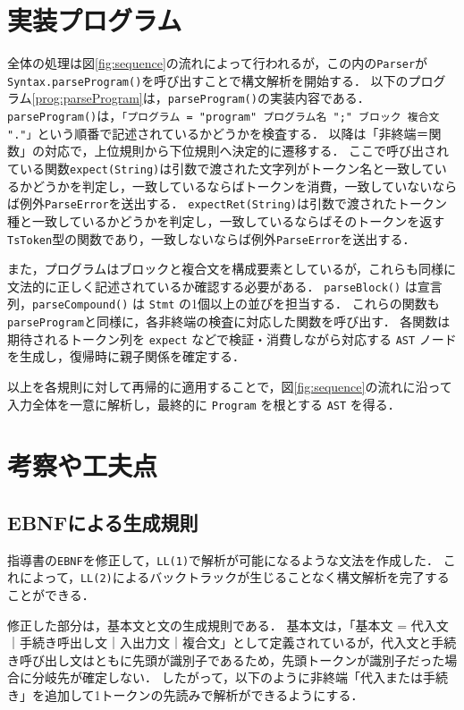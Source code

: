 \documentclass[a4j,10pt]{jarticle}
\begin{document}
\section{実装プログラム}
全体の処理は図\ref{fig:sequence}の流れによって行われるが，この内の\verb|Parser|が\verb|Syntax.parseProgram()|を呼び出すことで構文解析を開始する．
以下のプログラム\ref{prog:parseProgram}は，\verb|parseProgram()|の実装内容である．
\verb|parseProgram()|は，\verb|「プログラム = "program" プログラム名 ";" ブロック 複合文 "."」|という順番で記述されているかどうかを検査する．
以降は「非終端＝関数」の対応で，上位規則から下位規則へ決定的に遷移する．
ここで呼び出されている関数\verb|expect(String)|は引数で渡された文字列がトークン名と一致しているかどうかを判定し，一致しているならばトークンを消費，一致していないならば例外\verb|ParseError|を送出する．
\verb|expectRet(String)|は引数で渡されたトークン種と一致しているかどうかを判定し，一致しているならばそのトークンを返す\verb|TsToken|型の関数であり，一致しないならば例外\verb|ParseError|を送出する．

また，プログラムはブロックと複合文を構成要素としているが，これらも同様に文法的に正しく記述されているか確認する必要がある．
\verb|parseBlock()| は宣言列，\verb|parseCompound()| は \verb|Stmt| の1個以上の並びを担当する．
これらの関数も\verb|parseProgram|と同様に，各非終端の検査に対応した関数を呼び出す．
各関数は期待されるトークン列を \verb|expect| などで検証・消費しながら対応する \verb|AST| ノードを生成し，復帰時に親子関係を確定する．

以上を各規則に対して再帰的に適用することで，図\ref{fig:sequence}の流れに沿って入力全体を一意に解析し，最終的に \verb|Program| を根とする \verb|AST| を得る．







\section{考察や工夫点}
\subsection{EBNFによる生成規則}
指導書の\verb|EBNF|を修正して，\verb|LL(1)|で解析が可能になるような文法を作成した．
これによって，\verb|LL(2)|によるバックトラックが生じることなく構文解析を完了することができる．

修正した部分は，基本文と文の生成規則である．
基本文は，「基本文 = 代入文｜手続き呼出し文｜入出力文｜複合文」として定義されているが，代入文と手続き呼び出し文はともに先頭が識別子であるため，先頭トークンが識別子だった場合に分岐先が確定しない．
したがって，以下のように非終端「代入または手続き」を追加して1トークンの先読みで解析ができるようにする．
\end{document}
